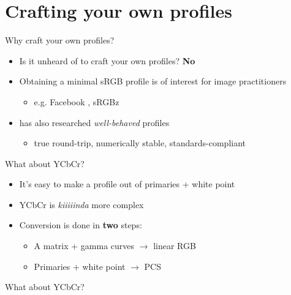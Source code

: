 \documentclass[final, aspectratio=169]{divoc}
\begin{document}
\section{Crafting your own profiles}
\begin{frame}{Why craft your own profiles?}
  \begin{itemize}
    \item Is it unheard of to craft your own profiles? \textbf{No}
    \item Obtaining a minimal sRGB profile is of interest for image practitioners
          \begin{itemize}
            \item e.g. Facebook \autocite{facebookRgb}, sRGBz \autocite{photosauce1}
          \end{itemize}
    \item \textcite{stone4} has also researched \emph{well-behaved} profiles
          \begin{itemize}
            \item true round-trip, numerically stable, standards-compliant
          \end{itemize}
  \end{itemize}
\end{frame}
\begin{frame}{What about YCbCr?}
  \begin{itemize}
    \item It's easy to make a profile out of primaries + white point
    \item YCbCr is \emph{kiiiiinda} more complex
    \item Conversion is done in \textbf{two} steps:
          \begin{itemize}
            \item A matrix + gamma curves $\rightarrow$ linear RGB
            \item Primaries + white point $\rightarrow$ PCS 
          \end{itemize}
  \end{itemize}
\end{frame}
\begin{frame}{What about YCbCr?}
  \begin{center}
    \Large


  \end{center}
\end{frame}
\end{document}
